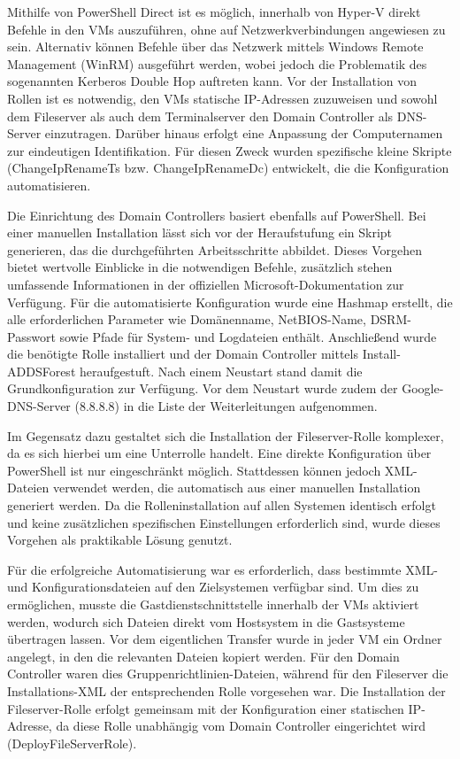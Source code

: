 \documentclass[conference]{IEEEtran}
\begin{document}
Mithilfe von PowerShell Direct ist es möglich, innerhalb von Hyper-V direkt Befehle in den VMs auszuführen, ohne auf Netzwerkverbindungen angewiesen zu sein. Alternativ können Befehle über das Netzwerk mittels Windows Remote Management (WinRM) ausgeführt werden, wobei jedoch die Problematik des sogenannten Kerberos Double Hop auftreten kann. Vor der Installation von Rollen ist es notwendig, den VMs statische IP-Adressen zuzuweisen und sowohl dem Fileserver als auch dem Terminalserver den Domain Controller als DNS-Server einzutragen. Darüber hinaus erfolgt eine Anpassung der Computernamen zur eindeutigen Identifikation. Für diesen Zweck wurden spezifische kleine Skripte (ChangeIpRenameTs bzw. ChangeIpRenameDc) entwickelt, die die Konfiguration automatisieren.

Die Einrichtung des Domain Controllers basiert ebenfalls auf PowerShell. Bei einer manuellen Installation lässt sich vor der Heraufstufung ein Skript generieren, das die durchgeführten Arbeitsschritte abbildet. Dieses Vorgehen bietet wertvolle Einblicke in die notwendigen Befehle, zusätzlich stehen umfassende Informationen in der offiziellen Microsoft-Dokumentation zur Verfügung. Für die automatisierte Konfiguration wurde eine Hashmap erstellt, die alle erforderlichen Parameter wie Domänenname, NetBIOS-Name, DSRM-Passwort sowie Pfade für System- und Logdateien enthält. Anschließend wurde die benötigte Rolle installiert und der Domain Controller mittels Install-ADDSForest heraufgestuft. Nach einem Neustart stand damit die Grundkonfiguration zur Verfügung. Vor dem Neustart wurde zudem der Google-DNS-Server (8.8.8.8) in die Liste der Weiterleitungen aufgenommen.

Im Gegensatz dazu gestaltet sich die Installation der Fileserver-Rolle komplexer, da es sich hierbei um eine Unterrolle handelt. Eine direkte Konfiguration über PowerShell ist nur eingeschränkt möglich. Stattdessen können jedoch XML-Dateien verwendet werden, die automatisch aus einer manuellen Installation generiert werden. Da die Rolleninstallation auf allen Systemen identisch erfolgt und keine zusätzlichen spezifischen Einstellungen erforderlich sind, wurde dieses Vorgehen als praktikable Lösung genutzt.

Für die erfolgreiche Automatisierung war es erforderlich, dass bestimmte XML- und Konfigurationsdateien auf den Zielsystemen verfügbar sind. Um dies zu ermöglichen, musste die Gastdienstschnittstelle innerhalb der VMs aktiviert werden, wodurch sich Dateien direkt vom Hostsystem in die Gastsysteme übertragen lassen. Vor dem eigentlichen Transfer wurde in jeder VM ein Ordner angelegt, in den die relevanten Dateien kopiert werden. Für den Domain Controller waren dies Gruppenrichtlinien-Dateien, während für den Fileserver die Installations-XML der entsprechenden Rolle vorgesehen war. Die Installation der Fileserver-Rolle erfolgt gemeinsam mit der Konfiguration einer statischen IP-Adresse, da diese Rolle unabhängig vom Domain Controller eingerichtet wird (DeployFileServerRole).
\end{document}

